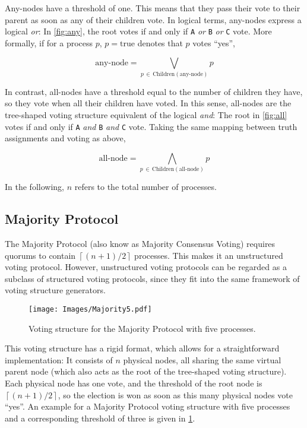 \documentclass[11pt,chapterprefix=true,toc=bibliography,numbers=noendperiod,
               footnotes=multiple,twoside]{scrreprt}
\begin{document}
Any-nodes have a threshold of one. This means that they pass their vote to their parent as soon as any of their children vote. In logical terms, any-nodes express a logical \emph{or}: In \cref{fig:any}, the root votes if and only if \texttt{A} \emph{or} \texttt{B} \emph{or} \texttt{C} vote. More formally, if for a process \(p\), \(p = \text{true}\) denotes that \(p\) votes \enquote{yes},

\[ \text{any-node} = \bigvee_{p\,\in\,\text{Children}(\text{any-node})} p \]

In contrast, all-nodes have a threshold equal to the number of children they have, so they vote when all their children have voted. In this sense, all-nodes are the tree-shaped voting structure equivalent of the logical \emph{and}: The root in \cref{fig:all} votes if and only if \texttt{A} \emph{and} \texttt{B} \emph{and} \texttt{C} vote. Taking the same mapping between truth assignments and voting as above,

\[ \text{all-node} = \bigwedge_{p\,\in\,\text{Children}(\text{all-node})} p \]

In the following, \(n\) refers to the total number of processes.

\subsection{Majority Protocol\label{ssc:majority}}

The Majority Protocol (also know as Majority Consensus Voting\autocite{majority}) requires quorums to contain \(\left\lceil (n + 1) / 2 \right\rceil\) processes. This makes it an unstructured voting protocol. However, unstructured voting protocols can be regarded as a subclass of structured voting protocols, since they fit into the same framework of voting structure generators.

\begin{figure}[h]
    \centering
    \texttt{[image: Images/Majority5.pdf]}
    \caption{Voting structure for the Majority Protocol with five processes.}
    \label{fig:majority5-struct}
\end{figure}

This voting structure has a rigid format, which allows for a straightforward implementation: It consists of \(n\) physical nodes, all sharing the same virtual parent node (which also acts as the root of the tree-shaped voting structure). Each physical node has one vote, and the threshold of the root node is \(\left\lceil (n + 1) / 2 \right\rceil\), so the election is won as soon as this many physical nodes vote \enquote{yes}. An example for a Majority Protocol voting structure with five processes and a corresponding threshold of three is given in \cref{fig:majority5-struct}.
\end{document}

